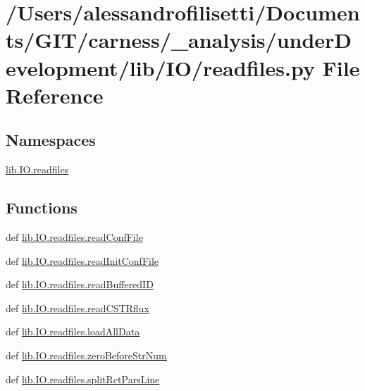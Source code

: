 \hypertarget{a00056}{\section{/\-Users/alessandrofilisetti/\-Documents/\-G\-I\-T/carness/\-\_\-analysis/under\-Development/lib/\-I\-O/readfiles.py File Reference}
\label{a00056}
}
\subsection*{Namespaces}
\begin{DoxyCompactItemize}
\item 
\hyperlink{a00115}{lib.\-I\-O.\-readfiles}
\end{DoxyCompactItemize}
\subsection*{Functions}
\begin{DoxyCompactItemize}
\item 
def \hyperlink{a00115_aa0985f97c9159003c7a4bd44d1a989f3}{lib.\-I\-O.\-readfiles.\-read\-Conf\-File}
\item 
def \hyperlink{a00115_af8a2deca70e9e04a4c4812d81430df19}{lib.\-I\-O.\-readfiles.\-read\-Init\-Conf\-File}
\item 
def \hyperlink{a00115_a4a56e157e25982ad4a7dedd03929dcd6}{lib.\-I\-O.\-readfiles.\-read\-Buffered\-I\-D}
\item 
def \hyperlink{a00115_ab6d9ae4f9d3c52b2aad8b50d9b110dc1}{lib.\-I\-O.\-readfiles.\-read\-C\-S\-T\-Rflux}
\item 
def \hyperlink{a00115_a5ddfb684cfa43cb2aa2d8246078c486c}{lib.\-I\-O.\-readfiles.\-load\-All\-Data}
\item 
def \hyperlink{a00115_a30cdb91109c2d6ea6e0abb808fe88c6f}{lib.\-I\-O.\-readfiles.\-zero\-Before\-Str\-Num}
\item 
def \hyperlink{a00115_a3a9416927822cf24fb30e1d57bf71412}{lib.\-I\-O.\-readfiles.\-split\-Rct\-Pars\-Line}
\end{DoxyCompactItemize}
